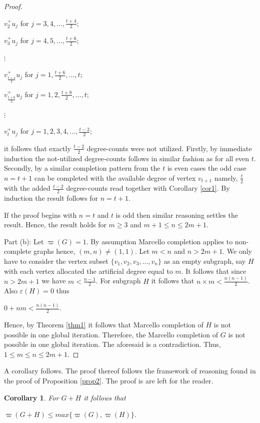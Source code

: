 \documentclass[12pt]{amsart}
\numberwithin{equation}{section}
\newtheorem{corollary}[theorem]{Corollary}
\numberwithin{equation}{section}
\begin{document}
\begin{proof}
\begin{center}
$v^+_2u_j$ for $j = 3,4,\dots,\frac{t+4}{2}$;

$v^+_3u_j$ for $j = 4,5,\dots,\frac{t+6}{2}$;

$\vdots$

$v^+_{\frac{t+4}{2}}u_j$ for $j = 1,\frac{t+6}{2},\dots,t$;

$v^+_{\frac{t+6}{2}}u_j$ for $j = 1,2,\frac{t+8}{2},\dots,t$;

$\vdots$

$v^+_tu_j$ for $j = 1,2,3,4,\dots,\frac{t-2}{2}$;
\end{center} 
it follows that exactly $\frac{t-2}{2}$ degree-counts were not utilized. Firstly, by immediate induction the not-utilized degree-counts follows in similar fashion as for all even $t$. Secondly, by a similar completion pattern from the $t$ is even cases the odd case $n = t+1$ can be completed with the available degree of vertex $v_{t+1}$ namely, $\frac{t}{2}$ with the added $\frac{t-2}{2}$ degree-counts read together with Corollary \ref{cor1}. By induction the result follows for $n = t+1$.

If the proof begins with $n = t$ and $t$ is odd then similar reasoning settles the result. Hence, the result holds for $m \geq 3$ and $m + 1 \leq n \leq 2m+1$.

Part (b): Let $\varpi(G) = 1$. By assumption Marcello completion applies to non-complete graphs hence, $(m,n) \neq (1,1)$. Let $m < n$ and $n > 2m+1$. We only have to consider the vertex subset $\{v_1,v_2,v_3,\dots, v_n\}$ as an empty subgraph, say $H$ with each vertex allocated the artificial degree equal to $m$. It follows that since $n > 2m+1$ we have $m < \frac{n-1}{2}$. For subgraph $H$ it follows that $n \times m < \frac{n(n-1)}{2}$. Also $\varepsilon(H) = 0$ thus
\begin{center}
$0 + nm < \frac{n(n-1)}{2}$.
\end{center}
Hence, by Theorem \ref{thm1} it follows that Marcello completion of $H$ is not possible in one global iteration. Therefore, the Marcello completion of $G$ is not possible in one global iteration. The aforesaid is a contradiction. Thus, $1 \leq m \leq n \leq 2m+1$.
\end{proof}
A corollary follows. The proof thereof follows the framework of reasoning found in the proof of Proposition \ref{prop2}. The proof is are left for the reader.
\begin{corollary}\label{cor3}
For $G + H$ it follows that
\begin{center}
$\varpi(G + H) \leq max\{\varpi(G),\varpi(H)\}$.
\end{center}
\end{corollary} 
\end{document}
